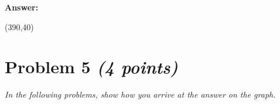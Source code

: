 \documentclass[11pt,twoside]{article}
\numberwithin{equation}{section}
\newcommand{\?}{\stackrel{?}{=}}
\begin{document}
\begin{enumerate}[\bf (a)]
\begin{figure}[h!]
\end{figure}

  \vspace{2ex}
  \begin{minipage}[]{.1\linewidth}
    {\bf Answer:}
  \end{minipage}\qquad
  \begin{minipage}[]{.8\linewidth}
    \framebox(390,40){\phantom{\Huge t}   }     
  \end{minipage}

\end{enumerate}

  \eject

\section*{Problem 5 \textit{(4 points)}}
{\it In the following problems, show how you arrive at the answer on the graph.}
\end{document}
